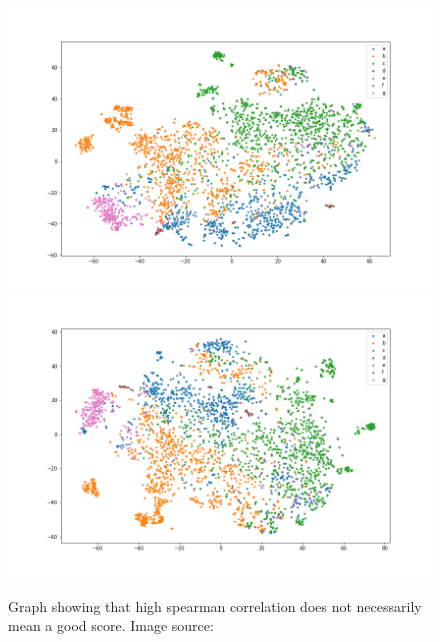\begin{figure}[!ht]
  \centering
  \includegraphics[width=0.4\linewidth]{latex/imgs/tsne_1_layer_with_schedule_1024_final.png}
  \includegraphics[width=0.4\linewidth]{latex/imgs/tsne_1_layer_with_schedule_1024_minloss.png}
  \caption{Graph showing that high spearman correlation does not necessarily mean a good score. Image source:\cite{spearman}}
\end{figure}


